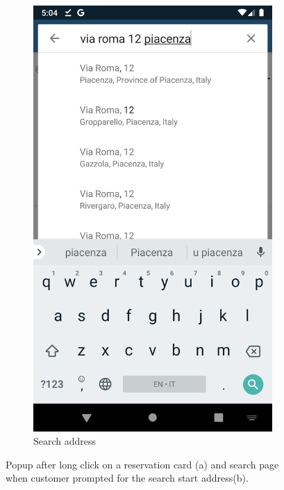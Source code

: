 \begin{figure}[h]
\begin{subfigure}{.5\textwidth}
  \includegraphics[height=.4\textheight, keepaspectratio=true]{Img/Screens/Customer_Search_Address}
  \caption{Search address}
\end{subfigure}
\caption{Popup after long click on a reservation card (a) and search page when customer prompted for the search start address(b).}
  \label{fig:addressSearch}
\end{figure}

